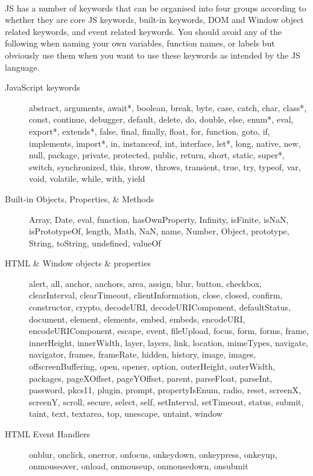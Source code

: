 \paragraph{} JS has a number of keywords that can be organised into four groups according to whether they are core JS keywords, built-in keywords, DOM and Window object related keywords, and event related keywords. You should avoid any of the following when naming your own variables, function names, or labels but obviously use them when you want to use these keywords as intended by the JS language.

\begin{description}
\item [JavaScript keywords] abstract, arguments, await*, boolean, break, byte, case, catch, char, class*, const, continue, debugger, default, delete, do, double, else, enum*, eval, export*, extends*, false, final, finally, float, for, function, goto, if, implements, import*, in, instanceof, int, interface, let*, long, native, new, null, package, private, protected, public, return, short, static, super*, switch, synchronized, this, throw, throws, transient, true, try, typeof, var, void, volatile, while, with, yield
\item [Built-in Objects, Properties, \& Methods]  Array, Date, eval, function, hasOwnProperty, Infinity, isFinite, isNaN, isPrototypeOf, length, Math, NaN, name, Number, Object, prototype, String, toString, undefined, valueOf
\item [HTML \& Window objects \& properties] alert, all, anchor, anchors, area, assign, blur, button, checkbox, clearInterval, clearTimeout, clientInformation, close, closed, confirm, constructor, crypto, decodeURI, decodeURIComponent, defaultStatus, document, element, elements, embed, embeds, encodeURI, encodeURIComponent, escape, event, fileUpload, focus, form, forms, frame, innerHeight, innerWidth, layer, layers, link, location, mimeTypes, navigate, navigator, frames, frameRate, hidden, history, image, images, offscreenBuffering, open, opener, option, outerHeight, outerWidth, packages, pageXOffset, pageYOffset, parent, parseFloat, parseInt, password, pkcs11, plugin, prompt, propertyIsEnum, radio, reset, screenX, screenY, scroll, secure, select, self, setInterval, setTimeout, status, submit, taint, text, textarea, top, unescape, untaint, window
\item [HTML Event Handlers] onblur, onclick, onerror, onfocus, onkeydown, onkeypress, onkeyup, onmouseover, onload, onmouseup, onmousedown, onsubmit
\end{description}

